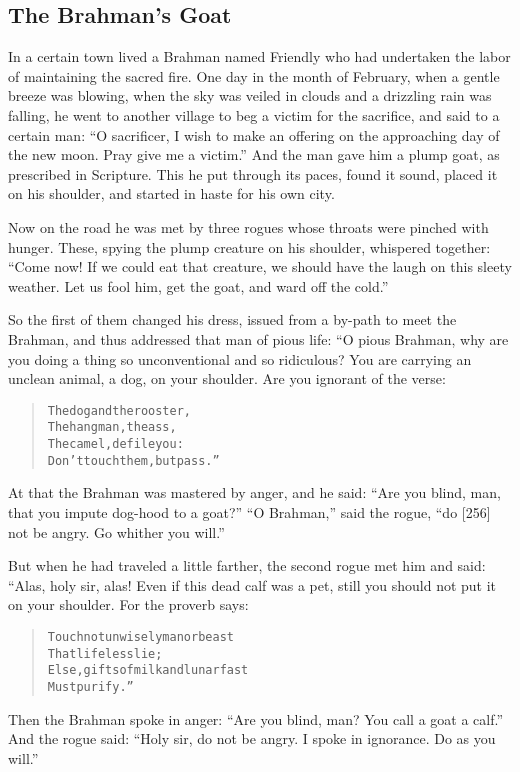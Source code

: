 \documentclass[article, twoside, 14pt]{memoir}
\renewenvironment{verbatim}{%
\begin{quote}%
\vskip -10pt%
\begin{alltt}\normalfont\large}{\end{alltt}%
\end{quote}%
\vskip -10pt
} %
\begin{document}
\subsection{The Brahman's Goat}

\label{s51}

In a certain town lived a Brahman named Friendly who had undertaken
the labor of maintaining the sacred fire. One day in the month of
February, when a gentle breeze was blowing, when the sky was veiled
in clouds and a drizzling rain was falling, he went to another
village to beg a victim for the sacrifice, and said to a certain
man:
``O sacrificer, I wish to make an offering on the approaching day of the new moon. Pray give me a victim.''
And the man gave him a plump goat, as prescribed in Scripture. This
he put through its paces, found it sound, placed it on his
shoulder, and started in haste for his own city.

Now on the road he was met by three rogues whose throats were
pinched with hunger. These, spying the plump creature on his
shoulder, whispered together:
``Come now! If we could eat that creature, we should have the laugh on this sleety weather. Let us fool him, get the goat, and ward off the cold.''

So the first of them changed his dress, issued from a by-path to
meet the Brahman, and thus addressed that man of pious life: “O
pious Brahman, why are you doing a thing so unconventional and so
ridiculous? You are carrying an unclean animal, a dog, on your
shoulder. Are you ignorant of the verse:

\begin{verbatim}
The dog and the rooster,
The hangman, the ass,
The camel, defile you:
Don't touch them, but pass.”
\end{verbatim}
At that the Brahman was mastered by anger, and he said:
``Are you blind, man, that you impute dog-hood to a goat?''
``O Brahman,'' said the rogue,
``do [256] not be angry. Go whither you will.''

But when he had traveled a little farther, the second rogue met him
and said: “Alas, holy sir, alas! Even if this dead calf was a pet,
still you should not put it on your shoulder. For the proverb
says:

\begin{verbatim}
Touch not unwisely man or beast
    That lifeless lie;
Else, gifts of milk and lunar fast
    Must purify.”
\end{verbatim}
Then the Brahman spoke in anger:
``Are you blind, man? You call a goat a calf.'' And the rogue said:
``Holy sir, do not be angry. I spoke in ignorance. Do as you will.''
\end{document}
